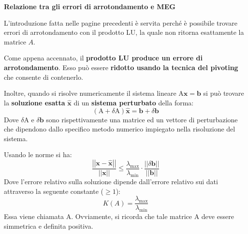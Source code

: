 \newpage

\begin{flushleft}
    \textcolor{Green3}{ \textbf{Relazione tra gli errori di arrotondamento e MEG}}
\end{flushleft}
L'introduzione fatta nelle pagine precedenti è servita perché è possibile trovare errori di arrotondamento con il prodotto LU, la quale non ritorna esattamente la matrice $A$.

\highspace
Come appena accennato, il \textbf{prodotto LU produce un errore di arrotondamento}. Esso può essere \textbf{ridotto usando la tecnica del pivoting} che consente di contenerlo.

\highspace
Inoltre, quando si risolve numericamente il sistema lineare $\mathrm{A}\mathbf{x} = \mathbf{b}$ si può trovare la \textbf{soluzione esatta} $\widehat{\mathbf{x}}$ di un \textbf{sistema perturbato} della forma:
\begin{equation}
    \left(\mathrm{A} + \delta \mathrm{A}\right) \widehat{\mathbf{x}} = \mathbf{b} + \delta \mathbf{b}
\end{equation}
Dove $\delta \mathrm{A}$ e $\delta \mathbf{b}$ sono rispettivamente una matrice ed un vettore di perturbazione che dipendono dallo specifico metodo numerico impiegato nella risoluzione del sistema.

\highspace
Usando le norme si ha:
\begin{equation}\label{eq: errore di arrotondamento MEG - norma}
    \dfrac{
        \left|\left| \mathbf{x} - \widehat{\mathbf{x}} \right|\right|
    }{
        \left|\left| \mathbf{x} \right|\right|
    }
    \le
    \dfrac{\lambda_{\text{max}}}{\lambda_{\text{min}}}
    \cdot
    \dfrac{
        \left|\left| \delta \mathbf{b} \right|\right|
    }{
        \left|\left| \mathbf{b} \right|\right|
    }
\end{equation}
Dove l'errore relativo sulla soluzione dipende dall'errore relativo sui dati attraverso la seguente constante ($\ge 1$):
\begin{equation}
    K\left(A\right) = \dfrac{\lambda_{\text{max}}}{\lambda_{\text{min}}}
\end{equation}
Essa viene chiamata  A. Ovviamente, si ricorda che tale matrice A deve essere simmetrica e definita positiva.

